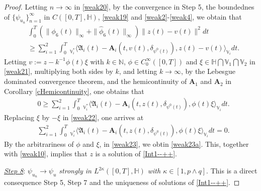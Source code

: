\documentclass[11pt]{article}
\renewcommand{\geq}{\geqslant}  %
\numberwithin{equation}{section}
\begin{document}
\begin{proof}
Letting $n\rightarrow\infty$ in \eqref{weak20}, by  the convergence in Step 5,
the boundednes of $\{\psi_{u_n}\}_{n=1}^\infty$
in $C([0,T], \mathbb{H})$,
\eqref{weak19} and \eqref{weak2}-\eqref{weak4}, we obtain that
\begin{align}
 \label{weak21}
&
\int_0^T
(\| \phi_6(t)\|_\infty +
\| \widehat{\phi} _6(t)\|_\infty
) \| z(t)-v(t)\|^2 dt
\nonumber\\
&
\geq
\sum_{i=1}^2\int_0^T
\ _{\mathbb{V}_i^*}\big\langle \mathfrak{A}_i(t)-\mathbf{A}_i(t,v(t),
\delta_{\psi^0(t)}),
z(t)-v(t)\big  \rangle_{\mathbb{V}_i}dt.
\end{align}
Letting $v:=z-k^{-1}\phi (t) \xi $ with $k\in \mathbb{N}$,
$\phi \in C^\infty_0 ([0,T]) $
and $\xi \in  \mathbb{H}
\bigcap
 \mathbb{V}_1   \bigcap   \mathbb{V}_2   $ in \eqref{weak21}, multiplying   both sides by $k$, and letting $k\rightarrow\infty$, by the Lebesgue dominated convergence theorem, and
the hemicontinuity of $\mathbf{A}_1$ and $\mathbf{A}_2$ in
Corollary
 \ref{cHemicontinuity}, one obtains that
\begin{align}&\label{weak22}
0\geq
\sum_{i=1}^2\int_0^T
\ _{\mathbb{V}_i^*}\big\langle \mathfrak{A}_i(t)-\mathbf{A}_i(t,z(t),
\delta_{\psi^0(t)}),
\phi (t) \xi \big  \rangle_{\mathbb{V}_i}dt.
\end{align}
Replacing $\xi $ by $-\xi$  in \eqref{weak22}, one arrives at
\begin{align}&\label{weak23}
\sum_{i=1}^2\int_0^T
\ _{\mathbb{V}_i^*}\big\langle \mathfrak{A}_i(t)-\mathbf{A}_i(t,z(t),
\delta_{\psi^0(t)}),
\phi (t) \xi \big  \rangle_{\mathbb{V}_i}dt=0.
\end{align}
By the arbitrariness of $\phi$ and $\xi$,
  in
\eqref{weak23}, we obtin  \eqref{weak23a}.
This, together with \eqref{weak10},
implies that $z$
is a solution of \eqref{Int1--++}.

\underline{\emph{Step 8}}:\emph{ \emph{$\psi_{u_n}\rightarrow \psi_{u}$ strongly in $L^{2\kappa}([0,T],\mathbb{H})$ with $\kappa\in[1,p\wedge q]$}}. This is a direct consequence
Step 5, Step 7 and the uniqueness of
solutions of \eqref{Int1--++}.


\end{proof}
\end{document}
